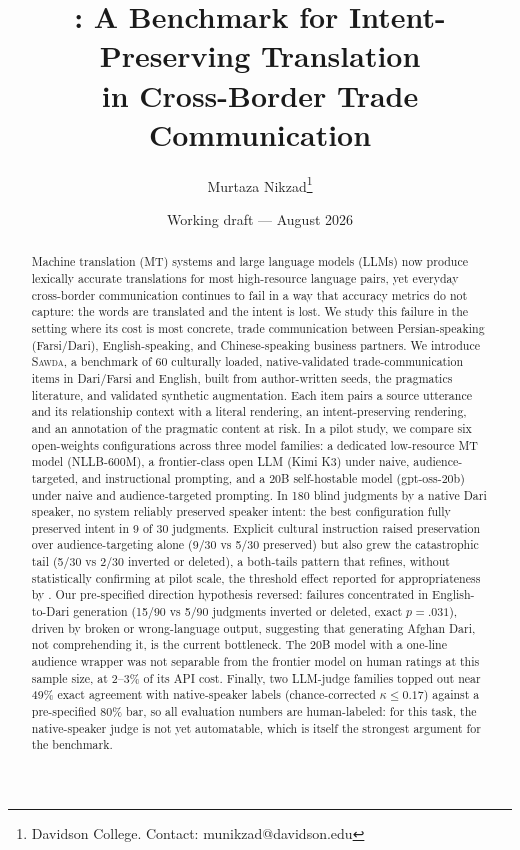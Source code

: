 \documentclass[11pt]{article}
\title{\bench: A Benchmark for Intent-Preserving Translation \\ in Cross-Border Trade Communication}
\author{
  Murtaza Nikzad\thanks{Davidson College. Contact: munikzad@davidson.edu} \and
  \tbd{co-authors: R. Ramanujan? J. Leigh (see acknowledgments note)}
}
\date{Working draft --- August 2026}
\newcommand{\bench}{\textsc{Sawda}}
\begin{document}
\maketitle

\begin{abstract}
Machine translation (MT) systems and large language models (LLMs) now produce lexically accurate translations for most high-resource language pairs, yet everyday cross-border communication continues to fail in a way that accuracy metrics do not capture: the words are translated and the intent is lost. We study this failure in the setting where its cost is most concrete, trade communication between Persian-speaking (Farsi/Dari), English-speaking, and Chinese-speaking business partners. We introduce \bench{}, a benchmark of 60 culturally loaded, native-validated trade-communication items in Dari/Farsi and English, built from author-written seeds, the pragmatics literature, and validated synthetic augmentation. Each item pairs a source utterance and its relationship context with a literal rendering, an intent-preserving rendering, and an annotation of the pragmatic content at risk. In a pilot study, we compare six open-weights configurations across three model families: a dedicated low-resource MT model (NLLB-600M), a frontier-class open LLM (Kimi K3) under naive, audience-targeted, and instructional prompting, and a 20B self-hostable model (gpt-oss-20b) under naive and audience-targeted prompting. In 180 blind judgments by a native Dari speaker, no system reliably preserved speaker intent: the best configuration fully preserved intent in 9 of 30 judgments. Explicit cultural instruction raised preservation over audience-targeting alone (9/30 vs 5/30 preserved) but also grew the catastrophic tail (5/30 vs 2/30 inverted or deleted), a both-tails pattern that refines, without statistically confirming at pilot scale, the threshold effect reported for appropriateness by \citet{tenzer2026pragmatics}. Our pre-specified direction hypothesis reversed: failures concentrated in English-to-Dari generation (15/90 vs 5/90 judgments inverted or deleted, exact $p=.031$), driven by broken or wrong-language output, suggesting that generating Afghan Dari, not comprehending it, is the current bottleneck. The 20B model with a one-line audience wrapper was not separable from the frontier model on human ratings at this sample size, at 2--3\% of its API cost. Finally, two LLM-judge families topped out near 49\% exact agreement with native-speaker labels (chance-corrected $\kappa \le 0.17$) against a pre-specified 80\% bar, so all evaluation numbers are human-labeled: for this task, the native-speaker judge is not yet automatable, which is itself the strongest argument for the benchmark.
\end{abstract}
\end{document}
